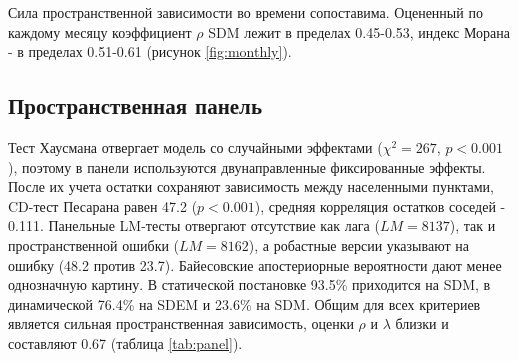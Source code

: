 \documentclass[12pt, a4paper]{article}
\begin{document}
Сила пространственной зависимости во времени сопоставима. Оцененный по каждому месяцу коэффициент
$\rho$ SDM лежит в пределах 0.45-0.53, индекс Морана - в пределах 0.51-0.61 (рисунок
\ref{fig:monthly}).

\subsection*{Пространственная панель}

Тест Хаусмана отвергает модель со случайными эффектами ($\chi^2 = 267$, $p < 0.001$), поэтому в
панели используются двунаправленные фиксированные эффекты. После их учета остатки сохраняют
зависимость между населенными пунктами, CD-тест Песарана равен 47.2 ($p < 0.001$), средняя корреляция
остатков соседей - 0.111. Панельные LM-тесты отвергают отсутствие как лага ($LM = 8137$), так и
пространственной ошибки ($LM = 8162$), а робастные версии указывают на ошибку (48.2 против 23.7).
Байесовские апостериорные вероятности дают менее однозначную картину. В статической постановке
93.5\% приходится на SDM, в динамической 76.4\% на SDEM и 23.6\% на SDM. Общим для всех критериев
является сильная пространственная зависимость, оценки $\rho$ и $\lambda$ близки и составляют 0.67
(таблица \ref{tab:panel}).
\end{document}
